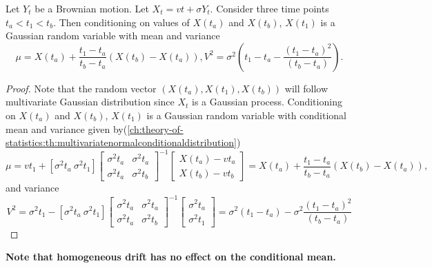 \begin{refsection}
\begin{lemma}
Let $Y_t$ be a Brownian motion. Let $X_t = vt + \sigma Y_t$. Consider three time points $t_a<t_1<t_b$. Then conditioning on values of $X(t_a)$ and $X(t_b)$,
	$X(t_1)$ is a Gaussian random variable with mean and variance $$\mu = X(t_a) + \frac{t_1-t_a}{t_b-t_a}(X(t_b)-X(t_a)), V^2 = \sigma^2( t_1-t_a - \frac{(t_1-t_a)^2}{(t_b-t_a)}).$$
\end{lemma}
\begin{proof}
	Note that the random vector $(X(t_a), X(t_1),X(t_b))$ will follow multivariate Gaussian distribution since $X_t$ is a Gaussian process. Conditioning on $X(t_a)$ and $X(t_b)$, $X(t_1)$ is a Gaussian random variable with conditional mean and variance given by(\autoref{ch:theory-of-statistics:th:multivariatenormalconditionaldistribution}) $$\mu=vt_1 +  [\sigma^2 t_a ~ \sigma^2 t_1]\begin{bmatrix}
	\sigma^2 t_a & \sigma^2 t_a\\
	\sigma^2 t_a & \sigma^2 t_b
	\end{bmatrix}^{-1}\begin{bmatrix}
	X(t_a) - vt_a\\
	X(t_b) - vt_b
	\end{bmatrix} = X(t_a) + \frac{t_1-t_a}{t_b-t_a}(X(t_b)-X(t_a)),$$
	and
	variance
	$$V^2 = \sigma^2 t_1 - [\sigma^2 t_a ~ \sigma^2 t_1]\begin{bmatrix}
	\sigma^2 t_a & \sigma^2 t_a\\
	\sigma^2 t_a & \sigma^2 t_b
	\end{bmatrix}^{-1}\begin{bmatrix}
	\sigma^2 t_a\\
	\sigma^2 t_1
	\end{bmatrix}= \sigma^2(t_1-t_a) - \sigma^2\frac{(t_1-t_a)^2}{(t_b-t_a)}$$
\end{proof}


\begin{remark}
\textbf{Note that homogeneous drift has no effect on the conditional mean.}	
\end{remark}


\end{refsection}
